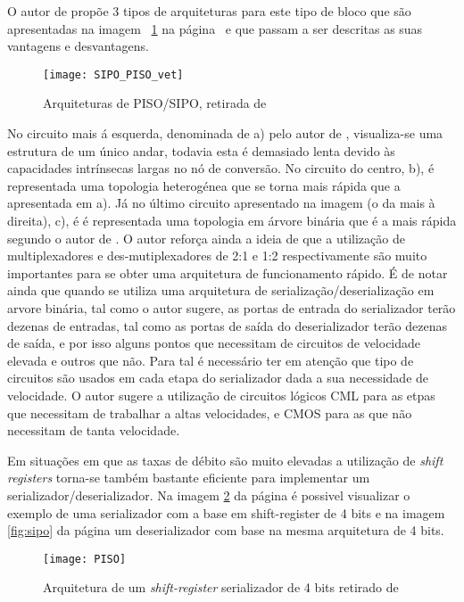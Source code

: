 O autor de \cite{R012} propõe 3 tipos de arquiteturas para este tipo de bloco que são apresentadas na imagem ~\ref{fig:PISO-SIPO} na página~\pageref{fig:PISO-SIPO} e que passam a ser descritas as suas vantagens e desvantagens.


	\begin{figure}[h!]
	\begin{center}
		\leavevmode
		\texttt{[image: SIPO\_PISO\_vet]}
		\caption{Arquiteturas de PISO/SIPO, retirada de \cite{R012}}
		\label{fig:PISO-SIPO}
	\end{center}
\end{figure}

No circuito mais á esquerda, denominada de a) pelo autor de \cite{R012}, visualiza-se uma estrutura de um único andar, todavia esta é demasiado lenta devido às capacidades intrínsecas largas no nó de conversão. No circuito do centro, b), é representada uma topologia  heterogénea que se torna mais rápida que a apresentada em a). Já no último circuito apresentado na imagem (o da mais à direita), c), é é representada uma topologia em árvore binária que é a mais rápida segundo o autor de \cite{R012}. O autor reforça ainda a ideia de que a utilização de multiplexadores e des-mutiplexadores de 2:1 e 1:2 respectivamente são muito importantes para se obter uma arquitetura de funcionamento rápido. É de notar ainda que quando se utiliza uma arquitetura de serialização/deserialização em arvore binária, tal como o autor sugere, as portas de entrada do serializador terão dezenas de entradas, tal como as portas de saída do deserializador terão dezenas de saída, e por isso alguns pontos que necessitam de circuitos de velocidade elevada e outros que não. Para tal é necessário ter em atenção que tipo de circuitos são usados em cada etapa do serializador dada a sua necessidade de velocidade. O autor sugere a utilização de circuitos lógicos CML para as etpas que necessitam de trabalhar a altas velocidades, e CMOS para as que não necessitam de tanta velocidade.

Em situações em que as taxas de débito são muito elevadas a utilização de \textit{shift registers} torna-se também bastante eficiente para implementar um serializador/deserializador. Na imagem \ref{fig:piso} da página \pageref{fig:piso} é possivel visualizar o exemplo de uma serializador com a base em shift-register de 4 bits e na imagem \ref{fig:sipo} da página \pageref{fig:piso} um deserializador com base na mesma arquitetura de 4 bits.

	\begin{figure}[h!]
	\begin{center}
		\leavevmode
		\texttt{[image: PISO]}
		\caption{Arquitetura de um \textit{shift-register} serializador de 4 bits retirado de \cite{R034}}
		\label{fig:piso}
	\end{center}
\end{figure}

